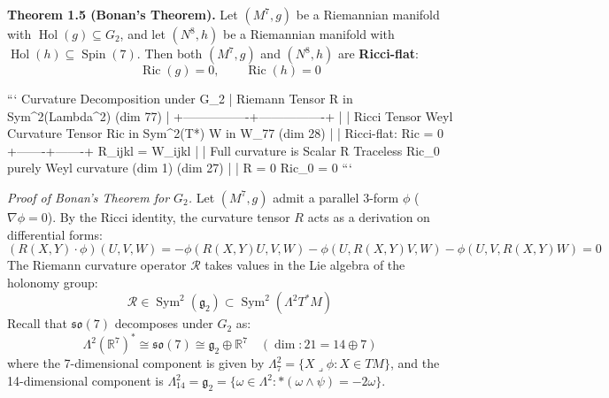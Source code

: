 \documentclass[11pt,twoside,openright]{amsbook}
\begin{document}
\textbf{Theorem 1.5 (Bonan's Theorem).} Let $(M^7, g)$ be a Riemannian manifold with $\operatorname{Hol}(g) \subseteq G_2$, and let $(N^8, h)$ be a Riemannian manifold with $\operatorname{Hol}(h) \subseteq \operatorname{Spin}(7)$. Then both $(M^7, g)$ and $(N^8, h)$ are \textbf{Ricci-flat}:
$$\operatorname{Ric}(g) = 0, \qquad \operatorname{Ric}(h) = 0$$

```
                           Curvature Decomposition under G_2
                                          |
                        Riemann Tensor R in Sym^2(Lambda^2)
                                   (dim 77)
                                      |
                     +----------------+----------------+
                     |                                 |
              Ricci Tensor                     Weyl Curvature Tensor
              Ric in Sym^2(T*)                       W in W_77
                 (dim 28)                              |
                     |                        Ricci-flat: Ric = 0
             +-------+-------+                R_ijkl = W_ijkl
             |               |                Full curvature is
        Scalar R       Traceless Ric_0        purely Weyl curvature
         (dim 1)          (dim 27)
            |                |
          R = 0          Ric_0 = 0
```

\textit{Proof of Bonan's Theorem for $G_2$.}
Let $(M^7, g)$ admit a parallel 3-form $\phi$ ($\nabla \phi = 0$). By the Ricci identity, the curvature tensor $R$ acts as a derivation on differential forms:
$$(R(X, Y) \cdot \phi)(U, V, W) = - \phi(R(X, Y)U, V, W) - \phi(U, R(X, Y)V, W) - \phi(U, V, R(X, Y)W) = 0$$
The Riemann curvature operator $\mathcal{R}$ takes values in the Lie algebra of the holonomy group:
$$\mathcal{R} \in \operatorname{Sym}^2(\mathfrak{g}_2) \subset \operatorname{Sym}^2(\Lambda^2 T^* M)$$
Recall that $\mathfrak{so}(7)$ decomposes under $G_2$ as:
$$\Lambda^2(\mathbb{R}^7)^* \cong \mathfrak{so}(7) \cong \mathfrak{g}_2 \oplus \mathbb{R}^7 \quad (\dim: 21 = 14 \oplus 7)$$
where the 7-dimensional component is given by $\Lambda^2_7 = \{ X \lrcorner \phi : X \in T M \}$, and the 14-dimensional component is $\Lambda^2_{14} = \mathfrak{g}_2 = \{ \omega \in \Lambda^2 : *(\omega \wedge \psi) = -2\omega \}$.
\end{document}
